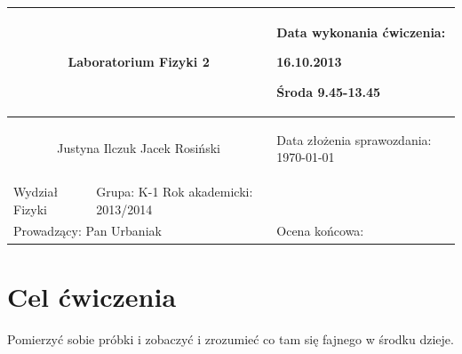 \documentclass[a4paper,12pt]{article}
\author{Justyna Ilczuk, Jacek Rosiński}
\begin{document}
\begin{center}

    \begin{tabular}{ | m{5cm}| m{5cm} | m{5cm} |}
    \hline 
    \multicolumn{2}{|c|}{{ \Large \textbf{Laboratorium Fizyki 2}} }
    &  
    \begin{center}
    Data wykonania ćwiczenia:
    \end{center}
    \begin{center}
      16.10.2013 
    \end{center}
    \begin{center}
    Środa 9.45-13.45
    \end{center}
     \\ 
    
    \hline
    \multicolumn{2}{|c|}{Justyna Ilczuk \newline Jacek Rosiński}
    & \begin{center}
    {\small Data złożenia sprawozdania:} \newline \today
    \end{center}   \\
   	
   	\hline
    Wydział Fizyki & Grupa: K-1 \newline Rok akademicki: 2013/2014 &  \\
   	\hline
   	\multicolumn{2}{|l|}{Prowadzący: Pan Urbaniak} & \multicolumn{1}{|l|}{Ocena końcowa:}\\
    \hline
    \end{tabular}
\end{center}

\newpage

\pagestyle{fancy}
\fancyfoot[CO]{\ }
\fancyhead[RO]{\footnotesize{\thepage} }




\section{Cel ćwiczenia}
Pomierzyć sobie próbki i zobaczyć i zrozumieć co tam się fajnego w środku dzieje.
\end{document}
